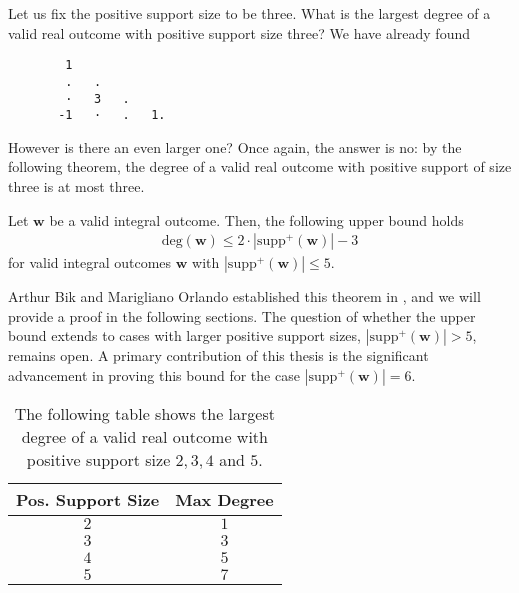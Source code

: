 \begin{example}
    Let us fix the positive support size to be three. What is the largest degree of a valid real outcome with positive support size three? We have already found
    \begin{verbatim}
        1  
        .   .     
        ·   3   .    
       -1   ·   .   1.   
    \end{verbatim} 
    However is there an even larger one? Once again, the answer is no: by the following theorem, the degree of a valid real outcome with positive support of size three is at most three.
 \end{example}

\begin{theorem}\label{thm:outcome-degree-support-size}
    Let \( \mathbf{w} \) be a valid integral outcome. Then, the following upper bound holds
    \begin{align*}
        \mathrm{deg}(\mathbf w) \leq 2 \cdot |\mathrm{supp}^+(\mathbf w)| - 3
    \end{align*}
    for valid integral outcomes \( \mathbf w \) with \( |\mathrm{supp}^+(\mathbf w)| \leq 5 \). 
\end{theorem}

Arthur Bik and Marigliano Orlando established this theorem in \cite{bik2022classifying}, and we will provide a proof in the following sections. The question of whether the upper bound extends to cases with larger positive support sizes, \( |\mathrm{supp}^+(\mathbf w)| > 5 \), remains open. A primary contribution of this thesis is the significant advancement in proving this bound for the case \( |\mathrm{supp}^+(\mathbf w)| = 6 \).

\begin{table}[h!] 
    \centering
    \begin{tabular}{|c|c|}
        \hline
        \textbf{Pos. Support Size} & \textbf{Max Degree} \\
        \hline
        \(2\) & \(1\) \\
        \(3\) & \(3\) \\
        \(4\) & \(5\) \\
        \(5\) & \(7\) \\
        \hline
    \end{tabular}
    \caption{    The following table shows the largest degree of a valid real outcome with positive support size \( 2,3,4 \) and \( 5 \).}
    \label{tab:support_size_degree}
\end{table}

